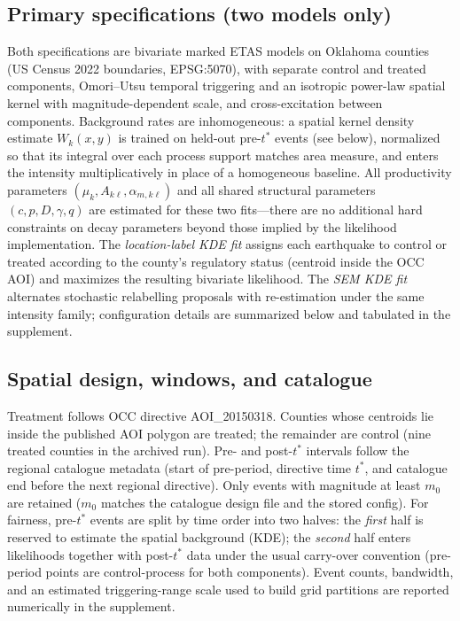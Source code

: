 \documentclass{statsoc}
\newcommand{\1}{\mathbbm{1}}
\begin{document}
\subsection{Primary specifications (two models only)}\label{sec:ok_primary_models}
Both specifications are bivariate marked ETAS models on Oklahoma counties (US Census 2022 boundaries, EPSG:5070), with separate control and treated components, Omori--Utsu temporal triggering and an isotropic power-law spatial kernel with magnitude-dependent scale, and cross-excitation between components. Background rates are inhomogeneous: a spatial kernel density estimate $W_k(x,y)$ is trained on held-out pre-$t^\ast$ events (see below), normalized so that its integral over each process support matches area measure, and enters the intensity multiplicatively in place of a homogeneous baseline. All productivity parameters $(\mu_k,A_{k\ell},\alpha_{m,k\ell})$ and all shared structural parameters $(c,p,D,\gamma,q)$ are estimated for these two fits---there are no additional hard constraints on decay parameters beyond those implied by the likelihood implementation. The \emph{location-label KDE fit} assigns each earthquake to control or treated according to the county's regulatory status (centroid inside the OCC AOI) and maximizes the resulting bivariate likelihood. The \emph{SEM KDE fit} alternates stochastic relabelling proposals with re-estimation under the same intensity family; configuration details are summarized below and tabulated in the supplement.

\subsection{Spatial design, windows, and catalogue}\label{sec:ok_design}
Treatment follows OCC directive AOI\_20150318. Counties whose centroids lie inside the published AOI polygon are treated; the remainder are control (nine treated counties in the archived run). Pre- and post-$t^\ast$ intervals follow the regional catalogue metadata (start of pre-period, directive time $t^\ast$, and catalogue end before the next regional directive). Only events with magnitude at least $m_0$ are retained ($m_0$ matches the catalogue design file and the stored config). For fairness, pre-$t^\ast$ events are split by time order into two halves: the \emph{first} half is reserved to estimate the spatial background (KDE); the \emph{second} half enters likelihoods together with post-$t^\ast$ data under the usual carry-over convention (pre-period points are control-process for both components). Event counts, bandwidth, and an estimated triggering-range scale used to build grid partitions are reported numerically in the supplement.
\end{document}

